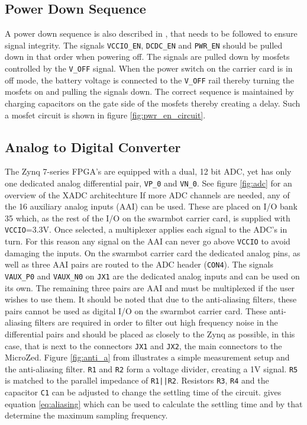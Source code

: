\subsection{Power Down Sequence}
A power down sequence is also described in \cite{design_carrier}, that needs to be followed to ensure signal integrity. 
The signals \texttt{VCCIO\_EN}, \texttt{DCDC\_EN} and \texttt{PWR\_EN} should be pulled down in that order when powering off.
The signals are pulled down by mosfets controlled by the \texttt{V\_OFF} signal.
When the power switch on the carrier card is in off mode, the battery voltage is connected to the \texttt{V\_OFF} rail thereby turning the mosfets on and pulling the signals down. 
The correct sequence is maintained by charging capacitors on the gate side of the mosfets thereby creating a delay.
Such a mosfet circuit is shown in figure \ref{fig:pwr_en_circuit}.

\subsection{Analog to Digital Converter}
The Zynq 7-series FPGA's are equipped with a dual, 12 bit ADC, yet has only one dedicated analog differential pair, \texttt{VP\_0} and \texttt{VN\_0}.
See figure \ref{fig:adc} for an overview of the XADC architechture
If more ADC channels are needed, any of the 16 auxiliary analog inputs (AAI) can be used.
These are placed on I/O bank 35 which, as the rest of the I/O on the swarmbot carrier card, is supplied with \texttt{VCCIO}=3.3V.
Once selected, a multiplexer applies each signal to the ADC's in turn.
For this reason any signal on the AAI can never go above \texttt{VCCIO} to avoid damaging the inputs.
On the swarmbot carrier card the dedicated analog pins, as well as three AAI pairs are routed to the ADC header (\texttt{CON4}).
The signals \texttt{VAUX\_P0} and \texttt{VAUX\_N0} on \texttt{JX1} are the dedicated analog inputs and can be used on its own.
The remaining three pairs are AAI and must be multiplexed if the user wishes to use them.
It should be noted that due to the anti-aliasing filters, these pairs cannot be used as digital I/O on the swarmbot carrier card.
These anti-aliasing filters are required in order to filter out high frequency noise in the differential pairs and should be placed as closely to the Zynq as possible, in this case, that is next to the connectors \texttt{JX1} and \texttt{JX2}, the main connectors to the MicroZed.
Figure \ref{fig:anti_a} from \cite{adch} illustrates a simple measurement setup and the anti-aliasing filter.
\texttt{R1} and \texttt{R2} form a voltage divider, creating a 1V signal.
\texttt{R5} is matched to the parallel impedance of \texttt{R1||R2}.
Resistors \texttt{R3}, \texttt{R4} and the capacitor \texttt{C1} can be adjusted to change the settling time of the circuit.
\cite{adc} gives equation \ref{eq:aliasing} which can be used to calculate the settling time and by that determine the maximum sampling frequency.

